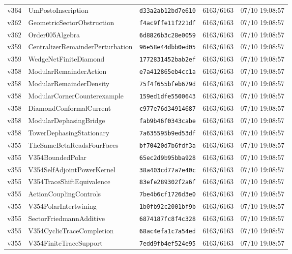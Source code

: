 \documentclass[11pt]{article}
\theoremstyle{definition}\newtheorem{deriv}{Derivação}
\begin{document}
{\begin{longtable}{@{}lllll@{}}
v364 & UmPostoInscription & \texttt{d33a2ab12bd7e610} & 6163/6163 & 07/10 19:08:57 \\
v362 & GeometricSectorObstruction & \texttt{f4ac9ffe11f221df} & 6163/6163 & 07/10 19:08:57 \\
v362 & Order005Algebra & \texttt{6d8826b3c28e0059} & 6163/6163 & 07/10 19:08:57 \\
v359 & CentralizerRemainderPerturbation & \texttt{96e58e44dbb0ed05} & 6163/6163 & 07/10 19:08:57 \\
v359 & WedgeNetFiniteDiamond & \texttt{1772831452bab2ef} & 6163/6163 & 07/10 19:08:57 \\
v358 & ModularRemainderAction & \texttt{e7a412865eb4cc1a} & 6163/6163 & 07/10 19:08:57 \\
v358 & ModularRemainderDensity & \texttt{75f4f655bfeb679d} & 6163/6163 & 07/10 19:08:57 \\
v358 & ModularCornerCounterexample & \texttt{159ed1dfe5500643} & 6163/6163 & 07/10 19:08:57 \\
v358 & DiamondConformalCurrent & \texttt{c977e76d34914687} & 6163/6163 & 07/10 19:08:57 \\
v358 & ModularDephasingBridge & \texttt{fab9b46f0343cabe} & 6163/6163 & 07/10 19:08:57 \\
v358 & TowerDephasingStationary & \texttt{7a635595b9ed53df} & 6163/6163 & 07/10 19:08:57 \\
v355 & TheSameBetaReadsFourFaces & \texttt{bf70420d7b6fdf3a} & 6163/6163 & 07/10 19:08:57 \\
v355 & V354BoundedPolar & \texttt{65ec2d9b95bba928} & 6163/6163 & 07/10 19:08:57 \\
v355 & V354SelfAdjointPowerKernel & \texttt{38a403cd77a7e40c} & 6163/6163 & 07/10 19:08:57 \\
v355 & V354TraceShiftEquivalence & \texttt{83efe289302f2a6f} & 6163/6163 & 07/10 19:08:57 \\
v355 & ActionCouplingControls & \texttt{7be4b6cf1726d3e0} & 6163/6163 & 07/10 19:08:57 \\
v355 & V354PolarIntertwining & \texttt{1b0fb92c2001bf9b} & 6163/6163 & 07/10 19:08:57 \\
v355 & SectorFriedmannAdditive & \texttt{6874187fc8f4c328} & 6163/6163 & 07/10 19:08:57 \\
v355 & V354CyclicTraceCompletion & \texttt{68ac4efa1c7a54ed} & 6163/6163 & 07/10 19:08:57 \\
v355 & V354FiniteTraceSupport & \texttt{7edd9fb4ef524e95} & 6163/6163 & 07/10 19:08:57 \\

\end{longtable}}
\end{document}
